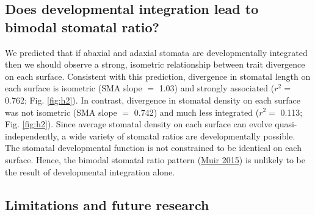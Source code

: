 \documentclass[
  12pt,
]{article}
\begin{document}
\hypertarget{does-developmental-integration-lead-to-bimodal-stomatal-ratio}{%
\subsection{Does developmental integration lead to bimodal stomatal ratio?}\label{does-developmental-integration-lead-to-bimodal-stomatal-ratio}}

We predicted that if abaxial and adaxial stomata are developmentally integrated then we should observe a strong, isometric relationship between trait divergence on each surface. Consistent with this prediction, divergence in stomatal length on each surface is isometric (SMA slope \(=\) 1.03) and strongly associated (\(r^2 =\) 0.762; Fig. \ref{fig:h2}). In contrast, divergence in stomatal density on each surface was not isometric (SMA slope \(=\) 0.742) and much less integrated (\(r^2 =\) 0.113; Fig. \ref{fig:h2}). Since average stomatal density on each surface can evolve quasi-independently, a wide variety of stomatal ratios are developmentally possible. The stomatal developmental function is not constrained to be identical on each surface. Hence, the bimodal stomatal ratio pattern (\protect\hyperlink{ref-muir_making_2015}{Muir 2015}) is unlikely to be the result of developmental integration alone.

\hypertarget{limitations-and-future-research}{%
\subsection{Limitations and future research}\label{limitations-and-future-research}}
\end{document}
